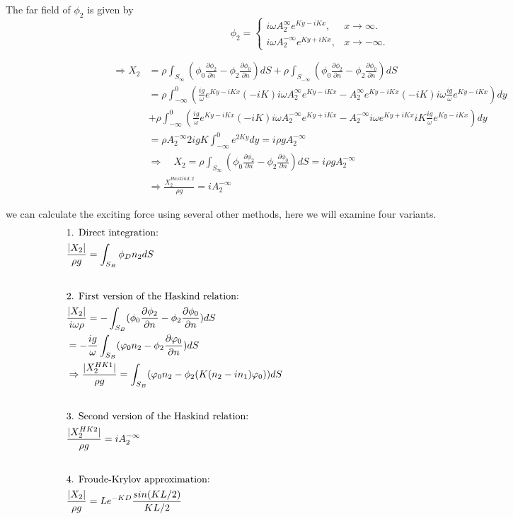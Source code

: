 \documentclass[a4paper,10pt]{article}
\newcommand{\dd}{\partial}
\begin{document}
The far field of $\phi_2$ is given by
\begin{equation} \label{int.eq.far}
	\phi_2 = \begin{cases}
		i \omega A_2^\infty e^{Ky - iKx}, & x \rightarrow \infty.\\
		i \omega A_2^{-\infty} e^{Ky + iKx}, & x \rightarrow -\infty.
	\end{cases} 
\end{equation}

\begin{align}
\Rightarrow X_2 &= \rho \int_{S_\infty} (\phi_0 \frac{\dd \phi_2}{\dd n} - \phi_2 \frac{\dd \phi_0}{\dd n}) dS + \rho \int_{S_{-\infty}} (\phi_0 \frac{\dd \phi_2}{\dd n} - \phi_2 \frac{\dd \phi_0}{\dd n}) dS\\
& = \rho \int_{-\infty}^0 (\frac{i g}{\omega} e^{Ky-iKx} (-iK) i \omega A_2^\infty e^{Ky -iKx} - A_2^\infty e^{Ky -iKx}(-iK) i \omega \frac{ig}{\omega} e^{Ky-iKx}) dy\\
& + \rho \int_{-\infty}^0 (\frac{ig}{\omega}e^{Ky-iKx} (-iK) i\omega A_2^{-\infty} e^{Ky+iKx} -A_2^{-\infty} i \omega e^{Ky+iKx} iK \frac{ig}{\omega} e^{Ky-iKx} ) dy\\
& = \rho A_2^{-\infty} 2 ig K \int_{-\infty}^0 e^{2Ky} dy = i \rho g A_2^{- \infty}\\
&\Rightarrow \quad X_2 = \rho \int_{S_\infty} (\phi_0 \frac{\dd \phi_2}{\dd n} - \phi_2 \frac{\dd \phi_0}{\dd n}) dS = i \rho g A_2^{-\infty}\\
& \Rightarrow \frac{X_2^{Haskind, 2}}{\rho g} = i A_2^{- \infty}
\end{align}

we can calculate the exciting force using several other methods, here we will examine four variants.\\[1 em]

\begin{alignat}{3}
&\text{1. Direct integration:} \nonumber \hspace{14 cm}\\
&\frac{\vert X_2 \vert}{\rho g} = \int_{S_B} \phi_D n_2 dS\\[2 em]
&\text{2. First version of the Haskind relation:}\nonumber\\
&\frac{| X_2 |}{i \omega \rho} = -\int_{S_B} (\phi_0 \frac{\dd \phi_2}{\dd n} - \phi_2 \frac{\dd \phi_0}{\dd n}) dS\\
& = - \frac{i g}{\omega} \int_{S_B} (\varphi_0 n_2 - \phi_2 \frac{\dd \varphi_0}{\dd n}) dS\\
& \Rightarrow \frac{|X_2^{HK1}|}{\rho g} = \int_{S_B} (\varphi_0 n_2 - \phi_2 (K(n_2 - in_1)\varphi_0) ) dS\\[2 em]
&\text{3. Second version of the Haskind relation:}\nonumber\\
&\frac{| X_2^{HK2}|}{\rho g} = i A_2^{-\infty}\\[2 em]
&\text{4. Froude-Krylov approximation:}\nonumber\\
&\frac{|X_2|}{\rho g} = L e^{-KD} \frac{sin(KL/2)}{KL/2}
\end{alignat}
\end{document}
